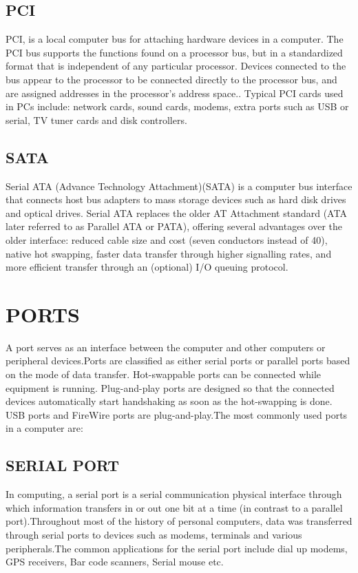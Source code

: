 			 \subsection{PCI}
	  PCI, is a local computer bus for attaching hardware devices in a computer. The PCI bus supports the
	  functions found on a processor bus, but in a standardized format that is independent of any particular
	  processor. Devices connected to the bus appear to the processor to be connected directly to the processor
	  bus, and are assigned addresses in the processor's address space.. Typical PCI cards used in PCs include: network 			cards, sound
	  cards, modems, extra ports such as USB or serial, TV tuner cards and disk controllers.
  			\subsection{SATA}
	   Serial ATA (Advance Technology Attachment)(SATA) is a computer bus interface that
	   connects host bus adapters to mass storage devices such as hard disk drives and optical drives. Serial ATA
	   replaces the older AT Attachment standard (ATA later referred to as Parallel ATA or PATA), offering
	   several advantages over the older interface: reduced cable size and cost (seven conductors instead of 40),
	   native hot swapping, faster data transfer through higher signalling rates, and more efficient transfer through
	   an (optional) I/O queuing protocol.
   		\section{PORTS}
	   A port serves as an interface between the computer and other computers or peripheral devices.Ports are classified 		as either serial ports or parallel ports
	   based on the mode of data transfer. Hot-swappable ports can be connected while equipment is running. Plug-and-play 		ports are designed so that the connected
	   devices automatically start handshaking as soon as the hot-swapping is done. USB ports and FireWire ports are
	   plug-and-play.The most commonly used ports in a computer are:
		 \subsection{SERIAL PORT}
	    In computing, a serial port is a serial communication physical interface through which
	    information transfers in or out one bit at a time (in contrast to a parallel port).Throughout most of the
	    history of personal computers, data was transferred through serial ports to devices such as modems,
	    terminals and various peripherals.The common applications for the serial port include
	    dial up modems, GPS receivers, Bar code scanners, Serial mouse etc.

